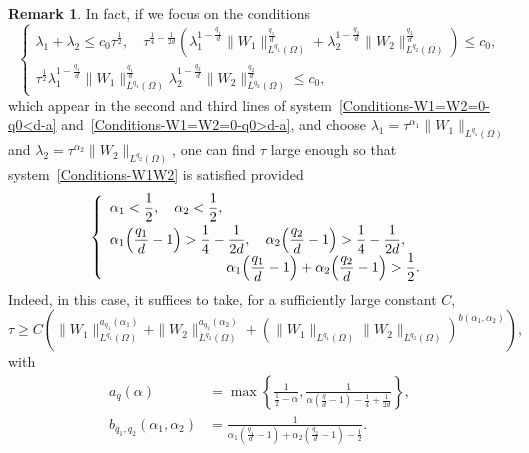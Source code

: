 \documentclass[10pt]{amsart}
\theoremstyle{definition}\newtheorem{defi}[theo]{Definition}\newtheorem{rema}[theo]{Remark}\newtheorem{exam}[theo]{Example}\newtheorem{exem}[theo]{Example}\newtheorem{nota}[theo]{Notation}
\newcommand*\ds{\displaystyle}
\renewcommand{\leq}{\leqslant}
\renewcommand{\geq}{\geqslant}
\begin{document}
\begin{rema}
In fact, if we focus on the conditions
\begin{equation}\label{Conditions-W1W2}
\left\{
\begin{array}{l}
\ds
\lambda_1 + \lambda_2 \leq c_0 \tau^{\frac{1}{2}}, \quad
\tau^{\frac{1}{4}-\frac{1}{2d}} \left(\lambda_1^{1- \frac{q_1}{d}} \| W_{1} \|_{L^{q_1}(\Omega)}^{ \frac{q_1}{d}} + \lambda_2^{1- \frac{q_2}{d}} \| W_{2} \|_{L^{q_2}(\Omega)}^{ \frac{q_2}{d}}\right) \leq c_0,
\\[0.15em]
\ds \tau^{\frac{1}{2}} \lambda_1^{1- \frac{q_1}{d}} \| W_{1} \|_{L^{q_1}(\Omega)}^{ \frac{q_1}{d}} \lambda_2^{1- \frac{q_2}{d}} \| W_{2} \|_{L^{q_2}(\Omega)}^{ \frac{q_2}{d}} \leq c_0,
\end{array}\right.
\end{equation}
which appear in the second and third lines of system~\eqref{Conditions-W1=W2=0-q0<d-a} and~\eqref{Conditions-W1=W2=0-q0>d-a}, and choose $\lambda_1 = \tau^{\alpha_1} \| W_1 \|_{L^{q_1}(\Omega)}$ and $\lambda_2 = \tau^{\alpha_2} \| W_2 \|_{L^{q_2}(\Omega)}$, one can find $\tau$ large enough so that system~\eqref{Conditions-W1W2} is satisfied provided
\begin{equation}\label{Conditions-alpha-1-2}
\left\{
\begin{array}{l}
\ds  \alpha_1 < \frac{1}{2},
\quad
\alpha_2 < \frac{1}{2},
\smallskip
\\
\ds  \alpha_1\! \left(\frac{q_1}{d}-1 \right)  > \frac{1}{4} - \frac{1}{2d},
\quad \alpha_2\! \left(\frac{q_2}{d}-1 \right)  >  \frac{1}{4} - \frac{1}{2d},
\\[0.25em]
\mkern150mu
\ds\alpha_1 \!\left(\frac{q_1}{d}-1 \right) + \alpha_2\! \left(\frac{q_2}{d}-1 \right)  >  \frac{1}{2}.
\end{array}\right.
\end{equation}
Indeed, in this case, it suffices to take, for a sufficiently large constant $C$,
\begin{equation}\label{Choice-tau}
\tau \geq C
\left(
\|W_1\|_{L^{q_1}(\Omega)}^{a_{q_1}(\alpha_1)} +
\|W_2\|_{L^{q_2}(\Omega)}^{a_{q_2} (\alpha_2)} +
\left(\|W_1\|_{L^{q_1}(\Omega)} \|W_2\|_{L^{q_2}(\Omega)}\right)^{b(\alpha_1, \alpha_2)}
\right),
\end{equation}
with
\begin{align*}
a_q(\alpha) &= \max\left\{\frac{1}{\ds \frac{1}{2} - \alpha}, \frac{1}{\ds \alpha \left(\frac{q}{d} -1 \right)- \frac{1}{4} + \frac{1}{2d} } \right\},
\\
b_{q_1, q_2} (\alpha_1, \alpha_2) &= \frac{1}{\ds \alpha_1 \left(\frac{q_1}{d} -1 \right)+ \alpha_2 \left(\frac{q_2}{d} -1 \right)- \frac{1}{2}}.

\end{align*}
\end{rema}
\end{document}
